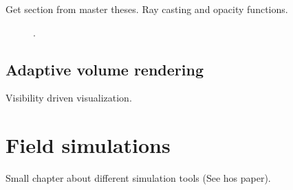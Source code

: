 Get section from master theses. Ray casting and opacity functions.

\begin{figure}
\centering
{}
\caption{.}
\label{fig:vr}
\end{figure}

\subsection{Adaptive volume rendering}

Visibility driven visualization.

\section{Field simulations}\label{sec:field}

Small chapter about different simulation tools (See hos paper).
			
\endinput

